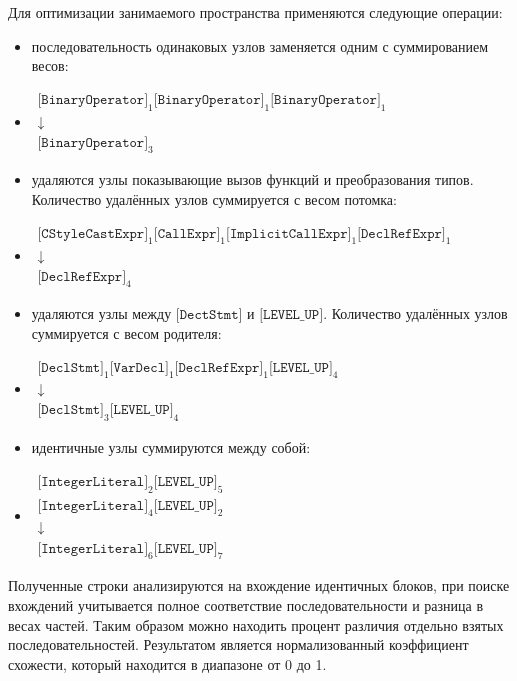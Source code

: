Для оптимизации занимаемого пространства применяются следующие операции:
\begin{itemize}
	\item последовательность одинаковых узлов заменяется одним с суммированием весов:
	\item [] $
	\begin{array}{c}
			\texttt{[BinaryOperator]}_1\texttt{[BinaryOperator]}_1\texttt{[BinaryOperator]}_1\\
			\downarrow\\
			\texttt{[BinaryOperator]}_3
	\end{array}$

	\item удаляются узлы показывающие вызов функций и преобразования типов. Количество удалённых узлов суммируется с весом потомка:
	\item [] $
	\begin{array}{c}
		\texttt{[CStyleCastExpr]}_1\texttt{[CallExpr]}_1\texttt{[ImplicitCallExpr]}_1\texttt{[DeclRefExpr]}_1\\
		\downarrow\\
		\texttt{[DeclRefExpr]}_4
	\end{array}$

	\item удаляются узлы между $\texttt{[DectStmt]}$ и $\texttt{[LEVEL\_UP]}$. Количество удалённых узлов суммируется с весом родителя:
	\item [] $
	\begin{array}{c}
		\texttt{[DeclStmt]}_1\texttt{[VarDecl]}_1\texttt{[DeclRefExpr]}_1\texttt{[LEVEL\_UP]}_4\\
		\downarrow\\
		\texttt{[DeclStmt]}_3\texttt{[LEVEL\_UP]}_4
	\end{array}$

	\item идентичные узлы суммируются между собой:
	\item [] $
	\begin{array}{c}
		\texttt{[IntegerLiteral]}_2\texttt{[LEVEL\_UP]}_5\\
		\texttt{[IntegerLiteral]}_4\texttt{[LEVEL\_UP]}_2\\
		\downarrow\\
		\texttt{[IntegerLiteral]}_6\texttt{[LEVEL\_UP]}_7
	\end{array}$
\end{itemize}

Полученные строки анализируются на вхождение идентичных блоков, при поиске вхождений учитывается полное соответствие последовательности и разница в весах частей. Таким образом можно находить процент различия отдельно взятых последовательностей. Результатом является нормализованный коэффициент схожести, который находится в диапазоне от 0 до 1.

